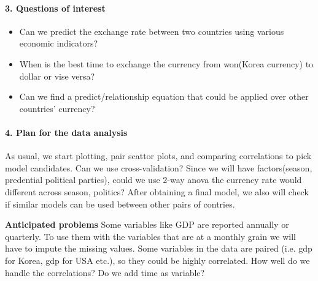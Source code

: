 \documentclass[12pt]{article}
\begin{document}
\paragraph{3. Questions of interest}
\begin{itemize}
    \item Can we predict the exchange rate between two countries using various
economic indicators? 
    \item When is the best time to exchange the currency from won(Korea currency) to dollar or vise versa? 
    \item Can we find a predict/relationship equation that could be applied over other countries' currency? 

\end{itemize}

\paragraph{4. Plan for the data analysis}
As usual, we start plotting, pair scattor plots, and comparing correlations to pick model candidates. Can we use cross-validation? Since we will have factors(season, predential political parties), could we use 2-way anova the currency rate would different across season, politics?
After obtaining a final model, we also will check if similar models can be
used between other pairs of contries.

\textbf{Anticipated problems}
Some variables like GDP are reported annually or quarterly. To use them with the
variables that are at a monthly grain we will have to impute the missing
values. Some variables in the data are paired (i.e. gdp for Korea, gdp for USA
etc.), so they could be highly correlated. How well do we handle the
correlations? Do we add time as variable? 
\end{document}
